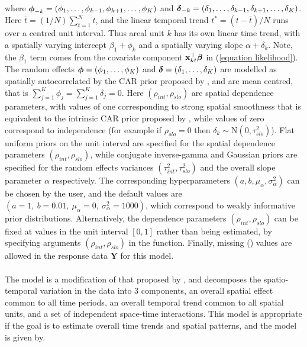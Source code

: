 \documentclass[article, nojss]{jss}
\newcommand{\bd}[1]{\ensuremath{\mbox{\boldmath $#1$}}}
\begin{document}
where $\bd{\phi}_{-k}=(\phi_{1},\ldots,\phi_{k-1}, \phi_{k+1},\ldots,\phi_{K})$ and $\bd{\delta}_{-k}=(\delta_{1},\ldots,\delta_{k-1}, \delta_{k+1},\ldots,\delta_{K})$. Here $\bar{t}=(1/N)\sum_{t=1}^N t$, and the linear temporal trend $t^{*}=(t - \bar{t})/N$ runs over a centred unit interval.  Thus areal unit $k$ has its own linear time trend, with a spatially varying intercept $\beta_{1}+\phi_{k}$ and a spatially varying slope $\alpha+\delta_{k}$. Note, the $\beta_1$ term comes from the covariate component $\mathbf{x}_{kt}^{\top}\bd{\beta}$ in (\ref{equation likelihood}). The random effects $\bd{\phi}=(\phi_1,\ldots,\phi_K)$ and  $\bd{\delta}=(\delta_1,\ldots,\delta_K)$ are modelled as spatially autocorrelated by the CAR prior proposed by \cite{leroux2000}, and are mean centred, that is $\sum_{j=1}^{K}\phi_{j}=\sum_{j=1}^{K}\delta_{j}=0$. Here $(\rho_{int}, \rho_{slo})$ are spatial dependence parameters, with values of one corresponding to strong spatial smoothness that is equivalent to the intrinsic CAR prior proposed by  \cite{besag1991}, while values of zero correspond to independence (for example if $\rho_{slo}=0$ then $\delta_k\sim\mbox{N}(0, \tau^2_{slo})$). Flat uniform priors on the unit interval are specified for the spatial dependence parameters $(\rho_{int}, \rho_{slo})$, while conjugate inverse-gamma and Gaussian priors are specified for the random effects variances $(\tau^2_{int}, \tau^2_{slo})$ and the overall slope parameter $\alpha$ respectively. The corresponding hyperparameters $(a, b, \mu_{\alpha}, \sigma^2_{\alpha})$ can be chosen by the user, and the default values are $(a=1, ~b=0.01,~ \mu_{\alpha}=0,~ \sigma^2_{\alpha}=1000)$, which correspond to weakly informative prior distributions. Alternatively, the dependence parameters $(\rho_{int}, \rho_{slo})$ can be fixed at values in the unit interval $[0,1]$ rather than being estimated, by specifying arguments $(\rho_{int}, \rho_{slo})$ in  the  function. Finally, missing () values are allowed in the response data $\mathbf{Y}$ for this model.\\

\\
The model is a  modification of that proposed by \cite{knorrheld2000},  and decomposes the spatio-temporal variation in the data into 3 components, an overall spatial effect common to all time periods, an overall temporal trend common to all spatial units, and a set of independent space-time interactions. This model is appropriate if the goal is to estimate overall time trends and spatial patterns, and the model  is given by.
\end{document}
